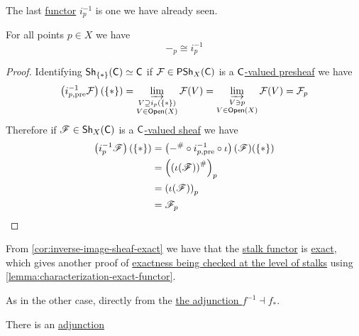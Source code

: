 \documentclass[../../main]{subfiles}
\begin{document}
The last \hyperref[def:functor]{functor} \(i_{p}^{-1}\) is one we have already seen.
\begin{lemma}\label{lemma:stalk-as-inverse-image}
  For all points \(p \in X\) we have
  \begin{equation*}
    -_{p} \cong i_{p}^{-1}
  \end{equation*}
\end{lemma}
\begin{proof}
  Identifying \hyperref[ex:one-point-sheaves-are-category]{\(\mathsf{Sh}_{\{\ast\}}(\mathsf{C}) \simeq \mathsf{C}\)} if \(\mathcal{F} \in \mathsf{PSh}_{X}(\mathsf{C})\) is a \hyperref[def:presheaf]{\(\mathsf{C}\)-valued presheaf} we have
  \begin{equation*}
    \left( i_{p, \operatorname*{pre}}^{-1} \mathcal{F} \right)(\{\ast\}) = \varinjlim_{\substack{V \supseteq i_{p}(\{\ast\}) \\ V \in \mathsf{Open}(X)}} \mathcal{F}(V) = \varinjlim_{\substack{V \ni p \\ V \in \mathsf{Open}(X)}} \mathcal{F}(V) = \mathcal{F}_{p}
  \end{equation*}
  Therefore if \(\mathscr{F} \in \mathsf{Sh}_{X}(\mathsf{C})\) is a \hyperref[def:sheaf]{\(\mathsf{C}\)-valued sheaf} we have
  \begin{align*}
    \left( i_{p}^{-1}\mathscr{F} \right)(\{\ast\}) &= \left( -^{\#} \circ i_{p, \operatorname*{pre}}^{-1} \circ \iota \right)(\mathscr{F})(\{\ast\}) \\
                                              &= \left( \left( \iota(\mathscr{F}) \right)^{\#} \right)_{p} \\
                                              &= \left( \iota(\mathscr{F}) \right)_{p} \\
                                              &= \mathscr{F}_{p} \qedhere
  \end{align*}
\end{proof}

\begin{remark}
  From \autoref{cor:inverse-image-sheaf-exact} we have that the \hyperref[def:stalk]{stalk functor} is \hyperref[def:exact-functor]{exact}, which gives another proof of \hyperref[cor:exactness-at-stalks]{exactness being checked at the level of stalks} using \autoref{lemma:characterization-exact-functor}.
\end{remark}

As in the other case, directly from the \hyperref[thm:direct-inverse-image-adjunction-sheaf]{the adjunction \(f^{-1} \dashv f_{\ast}\)}.
\begin{corollary}\label{cor:skyscraper-stalk-adjunction-sheaf}
  There is an \hyperref[def:adjoint-functors]{adjunction}
  \begin{center}
\end{center}
\end{corollary}
\end{document}

